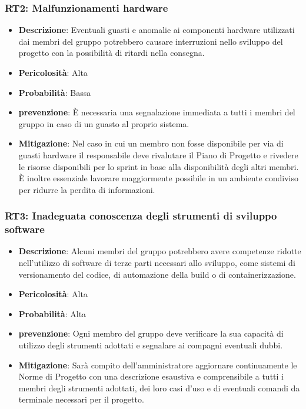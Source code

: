 \documentclass[a4paper, 12pt]{article}
\begin{document}
\subsubsection{RT2: Malfunzionamenti hardware}
\begin{itemize}
    \item \textbf{Descrizione}: Eventuali guasti e anomalie ai componenti hardware utilizzati dai membri del gruppo potrebbero causare 
    interruzioni nello sviluppo del progetto con la possibilità di ritardi nella consegna.
    \item \textbf{Pericolosità}: Alta
    \item \textbf{Probabilità}: Bassa
    \item \textbf{prevenzione}: È necessaria una segnalazione immediata a tutti i membri del gruppo in caso di un guasto al proprio sistema.
    \item \textbf{Mitigazione}: Nel caso in cui un membro non fosse disponibile per via di guasti hardware il responsabile deve 
    rivalutare il Piano di Progetto e rivedere le risorse disponibili per lo sprint in base alla disponibilità degli altri membri.
    È inoltre essenziale lavorare maggiormente possibile in un ambiente condiviso per ridurre la perdita di informazioni.
\end{itemize}
\subsubsection{RT3: Inadeguata conoscenza degli strumenti di sviluppo software}
\begin{itemize}
    \item \textbf{Descrizione}: Alcuni membri del gruppo potrebbero avere competenze ridotte nell'utilizzo di software di terze parti necessari allo sviluppo, 
    come sistemi di versionamento del codice, di automazione della build o di containerizzazione. 
    \item \textbf{Pericolosità}: Alta
    \item \textbf{Probabilità}: Alta
    \item \textbf{prevenzione}: Ogni membro del gruppo deve verificare la sua capacità di utilizzo degli strumenti adottati e segnalare ai compagni
    eventuali dubbi.
    \item \textbf{Mitigazione}: Sarà compito dell'amministratore aggiornare continuamente le Norme di Progetto con una descrizione esaustiva
    e comprensibile a tutti i membri degli strumenti adottati, dei loro casi d'uso e di eventuali comandi da terminale necessari per il progetto.
\end{itemize}
\end{document}
